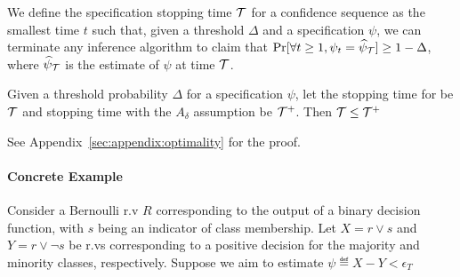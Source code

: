 \begin{definition}
We define the specification stopping time ${\mathcal{T}}$ for a confidence sequence as the smallest time $t$ such that, given a threshold $\Delta$ and a specification $\psi$, we can terminate any inference algorithm to claim that  $\Pr[\forall t \geq 1, \psi_t = \widehat{\psi}_{\mathcal{T}}] \geq 1 - \Delta$, where $\widehat{\psi}_{{\mathcal{T}}}$ is the estimate of $\psi$ at time ${\mathcal{T}}$.
\end{definition}

\begin{theorem}
\label{theorem:better-stopping}
Given a threshold probability $\Delta$ for a specification $\psi$, let the stopping time for \AVOIRmethodname{} be ${\mathcal{T}}$ and stopping time with the $A_\delta$ assumption be ${\mathcal{T}}^+$. Then ${\mathcal{T}} \leq {\mathcal{T}}^+$
\end{theorem}
See Appendix~\ref{sec:appendix:optimality} for the proof.




\paragraph{Concrete Example}
Consider a Bernoulli r.v $R$ corresponding to the output of a binary decision function, with $s$ being an indicator of class membership. 
Let $X = r \vee s$ and $Y = r \vee \neg s$ be r.vs corresponding to a positive decision for the majority and minority classes, respectively. 
Suppose we aim to estimate $\psi \eqdef X - Y < \epsilon_T$

